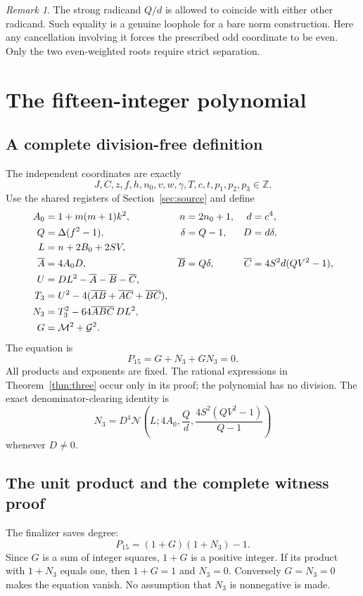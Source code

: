 \documentclass[11pt,letterpaper]{article}
\theoremstyle{remark}\newtheorem{remark}[theorem]{Remark}
\newcommand{\Z}{\mathbb Z}\newcommand{\N}{\mathbb N}\newcommand{\Q}{\mathbb Q}
\begin{document}
\begin{remark}
The strong radicand $Q/d$ is allowed to coincide with either other
radicand. Such equality is a genuine loophole for a bare norm construction.
Here any cancellation involving it forces the prescribed odd coordinate
to be even. Only the two even-weighted roots require strict separation.
\end{remark}

\section{The fifteen-integer polynomial}\label{sec:fifteen}

\subsection{A complete division-free definition}
The independent coordinates are exactly
\[
 \boxed{J,C,z,f,h,n_0,v,w,\gamma,T,c,t,p_1,p_2,p_3\in\Z.}
\]
Use the shared registers of Section~\ref{sec:source} and define
\begin{align}
 A_0&=1+m(m+1)k^2,&n&=2n_0+1,&d&=c^4,\notag\\
 Q&=\Delta(f^2-1),&\delta&=Q-1,&D&=d\delta,\notag\\
 L&=n+2B_0+2SV,\label{eq:15L}\\
 \overline A&=4A_0D,&\overline B&=Q\delta,&
 \overline C&=4S^2d(QV^2-1),\notag\\
 U&=DL^2-\overline A-\overline B-\overline C,\notag\\
 T_3&=U^2-4(\overline A\overline B+\overline A\overline C+
                  \overline B\overline C),\notag\\
 N_3&=T_3^2-64\overline A\overline B\overline C\,DL^2,\label{eq:15norm}\\
 G&=\mathcal M^2+\mathcal G^2.\notag
\end{align}
The equation is
\begin{equation}\label{eq:P15}
 \boxed{P_{15}=G+N_3+GN_3=0.}
\end{equation}
All products and exponents are fixed. The rational expressions in
Theorem~\ref{thm:three} occur only in its proof; the polynomial has no
division. The exact denominator-clearing identity is
\[
 N_3=D^4\mathscr N
 \left(L;4A_0,\frac Qd,\frac{4S^2(QV^2-1)}{Q-1}\right)
\]
whenever $D\ne0$.

\subsection{The unit product and the complete witness proof}
The finalizer saves degree:
\[
 P_{15}=(1+G)(1+N_3)-1.
\]
Since $G$ is a sum of integer squares, $1+G$ is a positive integer.
If its product with $1+N_3$ equals one, then $1+G=1$ and
$N_3=0$. Conversely $G=N_3=0$ makes the equation vanish.
No assumption that $N_3$ is nonnegative is made.
\end{document}
